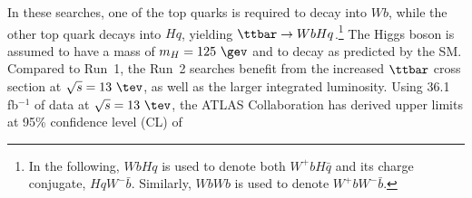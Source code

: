 In these searches, one of the top quarks is required to decay into $Wb$, while the other top quark decays into $Hq$, yielding $\ttbar \to WbHq$.\footnote{In the following, $WbHq$ is used to denote both $W^+b H\bar{q}$ and its charge conjugate, $HqW^- \bar{b}$. Similarly, 
$WbWb$ is used to denote $W^+b W^- \bar{b}$.}  The Higgs boson is assumed to have a mass of $m_H=125~\gev$ and to decay as predicted by
the SM.
Compared to Run~1, the Run~2 searches benefit from the increased $\ttbar$ cross section at $\sqrt{s}=13~\tev$, as well as the larger integrated luminosity.
Using 36.1 fb$^{-1}$ of data at $\sqrt{s}=13~\tev$, the ATLAS Collaboration has derived upper limits at 95\% confidence level (CL) of
